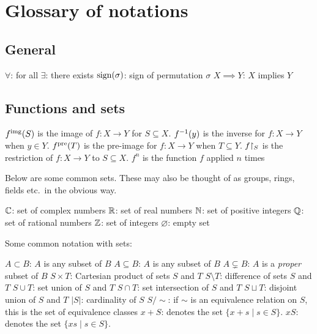 \chapter{Glossary of notations}
\section{General}
\begin{itemize}
	\ii $\forall$: for all
	\ii $\exists$: there exists
	\ii $\operatorname{sign}(\sigma)$: sign of permutation $\sigma$
	\ii $X \implies Y$: $X$ implies $Y$
\end{itemize}
\section{Functions and sets}
\begin{itemize}
	\ii $f^{\text{img}}(S)$ is the image of $f \colon X \to Y$ for $S \subseteq X$.
	\ii $f^{-1}(y)$ is the inverse for $f \colon X \to Y$ when $y \in Y$.
	\ii $f^{\text{pre}}(T)$ is the pre-image for $f \colon X \to Y$ when $T \subseteq Y$.
	\ii $f \restrict{S}$ is the restriction of $f \colon X \to Y$ to $S \subseteq X$.
	\ii $f^n$ is the function $f$ applied $n$ times
\end{itemize}

Below are some common sets.
These may also be thought of as groups,
rings, fields etc.\ in the obvious way.
\begin{itemize}
	\ii $\mathbb C$: set of complex numbers
	\ii $\mathbb R$: set of real numbers
	\ii $\mathbb N$: set of positive integers
	\ii $\mathbb Q$: set of rational numbers
	\ii $\mathbb Z$: set of integers
	\ii $\varnothing$: empty set
\end{itemize}

Some common notation with sets:
\begin{itemize}
	\ii $A \subset B$: $A$ is any subset of $B$
	\ii $A \subseteq B$: $A$ is any subset of $B$
	\ii $A \subsetneq B$: $A$ is a \emph{proper} subset of $B$
	\ii $S \times T$: Cartesian product of sets $S$ and $T$
	\ii $S \setminus T$: difference of sets $S$ and $T$
	\ii $S \cup T$: set union of $S$ and $T$
	\ii $S \cap T$: set intersection of $S$ and $T$
	\ii $S \sqcup T$: disjoint union of $S$ and $T$
	\ii $\left\lvert S \right\rvert$: cardinality of $S$
	\ii $S / {\sim}$: if $\sim$ is an equivalence relation on $S$,
	this is the set of equivalence classes
	\ii $x + S$: denotes the set $\{x+s \mid s \in S\}$.
	\ii $xS$: denotes the set $\{xs \mid s \in S\}$.
\end{itemize}

